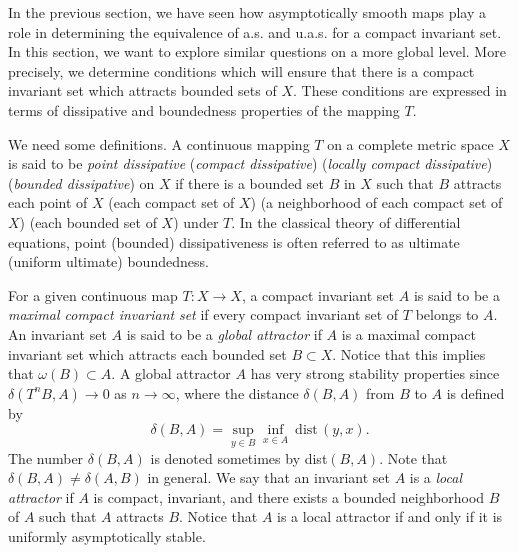 \documentclass{surv-l}
\theoremstyle{plain}
\theoremstyle{definition}
\numberwithin{equation}{section}
\numberwithin{figure}{chapter}
\begin{document}
In the previous section, we have seen how asymptotically smooth maps play a role in determining the equivalence of a.s. and u.a.s. for a compact invariant set. In this section, we want to explore similar questions on a more global level. More precisely, we determine conditions which will ensure that there is a compact invariant set which attracts bounded sets of $X$. These conditions are expressed in terms of dissipative and boundedness properties of the mapping $T$.

We need some definitions. A continuous mapping $T$ on a complete metric space $X$ is said to be \emph{point dissipative} (\emph{compact dissipative}) (\emph{locally compact} \emph{dissipative}) (\emph{bounded dissipative}) on $X$ if there is a bounded set $B$ in $X$ such that $B$ attracts each point of $X$ (each compact set of $X$) (a neighborhood of each compact set of $X$) (each bounded set of $X$) under $T$. In the classical theory of differential equations, point (bounded) dissipativeness is often referred to as ultimate (uniform ultimate) boundedness.

For a given continuous map $T\!:X\rightarrow X$, a compact invariant set $A$ is said to be a \emph{maximal compact invariant} \emph{set} if every compact invariant set of $T$ belongs to $A.$ An invariant set $A$ is said to be a \emph{global attractor} if $A$ is a maximal compact invariant set which attracts each bounded set $B\subset X$. Notice that this implies that $\omega(B)\subset A$. A global attractor $A$ has very strong stability properties since $\delta(T^{n}B, A)\rightarrow 0$ as $ n\rightarrow\infty$, where the distance $\delta(B, A)$  from $B$ to $A$ is defined by
\setcounter{section}{2}
\setcounter{equation}{0}
\begin{equation}\label{eq2.1}
\delta(B, A)=\sup_{y\in B}\inf_{x\in A}\ \mathrm{dist}\, (y, x).
\end{equation}
The number $\delta(B, A)$ is denoted sometimes by dist$(B, A)$. Note that $\delta(B, A)\neq \delta(A, B)$ in general. We say that an invariant set $A$ is a \emph{local attractor} if $A$ is compact, invariant, and there exists a bounded neighborhood $B$ of $A$ such that $A$ attracts $B$. Notice that $A$ is a local attractor if and only if it is uniformly asymptotically stable.
\end{document}
